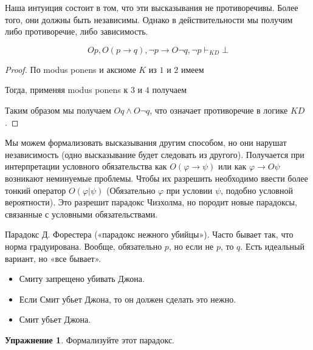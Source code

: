 \documentclass[openany]{book}
\theoremstyle{plain}
\theoremstyle{definition}
\newtheorem{xrc}{Упражнение}[]
\begin{document}
Наша интуиция состоит в том, что эти высказывания не противоречивы. Более того, они должны быть независимы. Однако в действительности мы получим либо противоречие, либо зависимость. 

\[O p, O (p \to q), \neg p \to O \neg q, \neg p \vdash_{K D} \bot\]

\begin{proof}
    По modus ponens и аксиоме \(K\) из \(1\) и \(2\) имеем

    \begin{prooftree}
    \end{prooftree}

    Тогда, применяя modus ponens к \(3\) и \(4\) получаем

    \begin{prooftree}
    \end{prooftree}

    Таким образом мы получаем \(O q \land O \neg q\), что означает противоречие в логике \(K D\).

\end{proof}

Мы можем формализовать высказывания другим способом, но они нарушат независимость (одно высказывание будет следовать из другого). Получается при интерпретации условного обязательства как \(O (\varphi \to \psi)\) или как \(\varphi \to O \psi\) возникают неминуемые проблемы. Чтобы их разрешить необходимо ввести более тонкий оператор \(O(\varphi | \psi)\) (Обязательно \(\varphi\) при условии \(\psi\), подобно условной вероятности). Это разрешит парадокс Чизхолма, но породит новые парадоксы, связанные с условными обязательствами. 


Парадокс Д. Форестера («парадокс нежного убийцы»). Часто бывает так, что норма градуирована. Вообще, обязательно \(p\), но если не \(p\), то \(q\). Есть идеальный вариант, но «все бывает».

\begin{itemize}
    \item{Смиту запрещено убивать Джона.}
    \item{Если Смит убьет Джона, то он должен сделать это нежно.}
    \item{Смит убьет Джона.}
\end{itemize}

\begin{xrc}
    Формализуйте этот парадокс.
\end{xrc}
\end{document}
